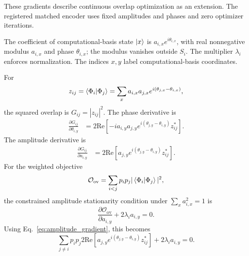 \label{app:gradients}

These gradients describe continuous overlap optimization as an extension. The registered matched encoder uses fixed amplitudes and phases and zero optimizer iterations.

The coefficient of computational-basis state $\ket{x}$ is $a_{i,x}e^{i\theta_{i,x}}$, with real nonnegative modulus $a_{i,x}$ and phase $\theta_{i,x}$; the modulus vanishes outside $S_i$. The multiplier $\lambda_i$ enforces normalization. The indices $x,y$ label computational-basis coordinates.

For
\begin{equation}
    z_{ij}=\braket{\Phi_i|\Phi_j}
    =
    \sum_x a_{i,x}a_{j,x}
    e^{i(\theta_{j,x}-\theta_{i,x})},
\end{equation}
the squared overlap is $G_{ij}=|z_{ij}|^2$. The phase derivative is
\begin{align}
    \frac{\partial G_{ij}}{\partial \theta_{i,y}}
    &=
    2\mathrm{Re}\left[
    -i a_{i,y}a_{j,y}
    e^{i(\theta_{j,y}-\theta_{i,y})}
    z_{ij}^{*}
    \right].
    \label{eq:phase_gradient}
\end{align}
The amplitude derivative is
\begin{align}
    \frac{\partial G_{ij}}{\partial a_{i,y}}
    &=
    2\mathrm{Re}\left[
    a_{j,y}e^{i(\theta_{j,y}-\theta_{i,y})}
    z_{ij}^{*}
    \right].
    \label{eq:amplitude_gradient}
\end{align}
For the weighted objective
\begin{equation}
    \mathcal{O}_{\mathrm{ov}}
    =
    \sum_{i<j}p_ip_j|\braket{\Phi_i|\Phi_j}|^2,
\end{equation}
the constrained amplitude stationarity condition under
$\sum_xa_{i,x}^2=1$ is
\begin{equation}
    \frac{\partial \mathcal{O}_{\mathrm{ov}}}{\partial a_{i,y}}
    +
    2\lambda_i a_{i,y}
    =
    0.
    \label{eq:lagrange_stationary}
\end{equation}
Using Eq.~\eqref{eq:amplitude_gradient}, this becomes
\begin{equation}
    \sum_{j\neq i} p_ip_j 2\mathrm{Re}\left[
    a_{j,y}e^{i(\theta_{j,y}-\theta_{i,y})}
    z_{ij}^{*}
    \right]
    +
    2\lambda_i a_{i,y}
    =
    0.
    \label{eq:amplitude_optimality}
\end{equation}


\label{sec:qec_prob_decoding}

